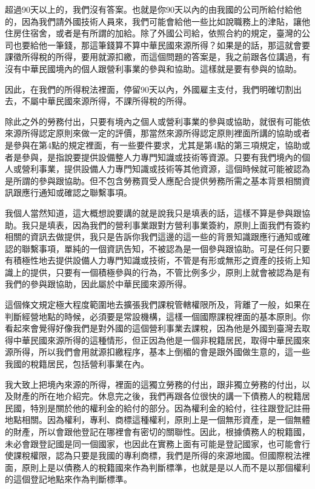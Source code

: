 \documentclass[]{ctexbook}
\begin{document}
超過90天以上的，我們沒有答案。也就是你90天以內的由我國的公司所給付給他的，因為我們請外國技術人員來，我們可能會給他一些比如說職務上的津貼，讓他住房住宿舍，或者是有所謂的加給。除了外國公司給，依照合約的規定，臺灣的公司也要給他一筆錢，那這筆錢算不算中華民國來源所得？如果是的話，那這就會要課徵所得稅的所得，要用就源扣繳，而這個問題的答案是，我之前跟各位講過，有沒有中華民國境內的個人跟營利事業的參與和協助。這樣就是要有參與的協助。

因此，在我們的所得稅法裡面，停留90天以內，外國雇主支付，我們明確切割出去，不屬中華民國來源所得，不課所得稅的所得。

除此之外的勞務付出，只要有境內之個人或營利事業的參與或協助，就很有可能依來源所得認定原則來做一定的評價，那當然來源所得認定原則裡面所講的協助或者是參與在第4點的規定裡面，有一些要件要求，尤其是第4點的第三項規定，協助或者是參與，是指說要提供設備整人力專門知識或技術等資源。只要有我們境內的個人或營利事業，提供設備人力專門知識或技術等其他資源，這個時候就可能被認為是所謂的參與跟協助。但不包含勞務買受人應配合提供勞務所需之基本背景相關資訊跟應行通知或確認之聯繫事項。

我個人當然知道，這大概想說要講的就是說我只是填表的話，這樣不算是參與跟協助。我只是填表，因為我們的營利事業跟對方營利事業簽約，原則上面我們有簽約相關的資訊去做提供，我只是告訴你我們這邊的這一些的背景知識跟應行通知或確認的聯繫事項，單純的一個資訊告知，不被認為是一個參與跟協助。可是任何只要有積極性地去提供設備人力專門知識或技術，不管是有形或無形之資產的技術上知識上的提供，只要有一個積極參與的行為，不管比例多少，原則上就會被認為是有我們的參與跟協助，因此屬於中華民國來源所得。

這個條文規定極大程度範圍地去擴張我們課稅管轄權限所及，背離了一般，如果在判斷經營地點的時候，必須要是常設機構，這樣一個國際課稅裡面的基本原則。你看起來會覺得好像我們是對外國的這個營利事業去課稅，因為他是外國到臺灣去取得中華民國來源所得的這種情形，但正因為他是一個非稅籍居民，取得中華民國來源所得，所以我們會用就源扣繳程序，基本上倒楣的會是跟外國做生意的，這一些我國的稅籍居民，包括營利事業在內。

我大致上把境內來源的所得，裡面的這獨立勞務的付出，跟非獨立勞務的付出，以及財產的所在地介紹完。休息完之後，我們再跟各位很快的講一下債務人的稅籍居民國，特別是關於他的權利金的給付的部分。因為權利金的給付，往往跟登記註冊地點相關。因為權利，專利、商標這種權利，原則上是一個無形資產，是一個無體的財產，所以會跟他登記在哪裡會有密切的關聯性。因此，根據債務人的稅籍國，未必會跟登記國是同一個國家，也因此在實務上面有可能是登記國家，也可能會行使課稅權限，認為只要是我國的專利商標，我們是所得的來源地國。但國際稅法裡面，原則上是以債務人的稅籍國來作為判斷標準，也就是是以人而不是以那個權利的這個登記地點來作為判斷標準。
\end{document}

